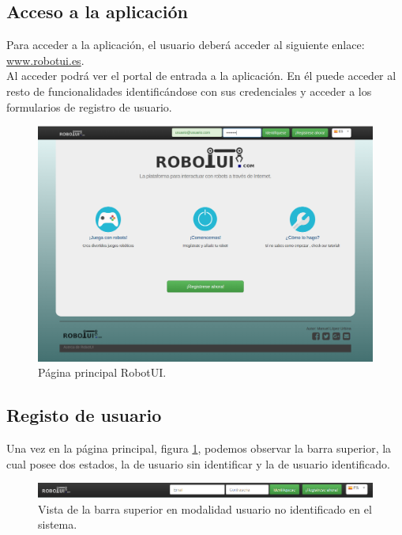 \subsection{ Acceso a la aplicación }
\label{sec:acceso-aplicacion}

Para acceder a la aplicación, el usuario deberá acceder al siguiente enlace: \url{www.robotui.es}. \\

Al acceder podrá ver el portal de entrada a la aplicación. En él puede acceder al resto de funcionalidades identificándose con sus credenciales y acceder a los formularios de registro
de usuario.\\

\begin{figure}[H]
  \begin{center}
    \includegraphics[scale=0.3]{imagenes/manual-usuario/pagina-principal.png}
  \end{center}
  \caption{Página principal RobotUI.}
  \label{website:pagina-principal}
\end{figure}

\subsection{ Registo de usuario }
\label{sec:creacion-usuario}

Una vez en la página principal, figura \ref{website:pagina-principal}, podemos observar la barra superior, la cual posee dos estados, la de usuario sin identificar y la de usuario identificado.

\begin{figure}[H]
  \begin{center}
    \includegraphics[scale=0.5]{imagenes/manual-usuario/barra-menu1.png}
  \end{center}
  \caption{Vista de la barra superior en modalidad usuario no identificado en el sistema.}
  \label{website:barra-inicial}
\end{figure}

